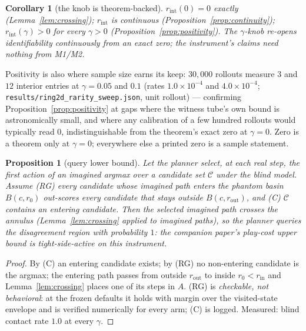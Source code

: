 \documentclass[11pt]{article}
\newtheorem{proposition}{Proposition}
\newtheorem{corollary}{Corollary}
\theoremstyle{remark}
\begin{document}
\begin{corollary}[the knob is theorem-backed]
\label{cor:knob}
$r_{\mathrm{int}}(0) = 0$ exactly (Lemma~\ref{lem:crossing});
$r_{\mathrm{int}}$ is continuous (Proposition~\ref{prop:continuity});
$r_{\mathrm{int}}(\gamma) > 0$ for every $\gamma > 0$
(Proposition~\ref{prop:positivity}). The $\gamma$-knob re-opens
identifiability \emph{continuously from an exact zero}; the instrument's
claims need nothing from M1/M2.
\end{corollary}

Positivity is also where sample size earns its keep: $30{,}000$ rollouts
measure $3$ and $12$ interior entries at $\gamma = 0.05$ and $0.1$
(rates $1.0\times10^{-4}$ and $4.0\times10^{-4}$;
\texttt{results/ring2d\_rarity\_sweep.json}, unit rollout) ---
confirming Proposition~\ref{prop:positivity} at gaps where the witness
tube's own bound is astronomically small, and where any calibration of a
few hundred rollouts would typically read $0$, indistinguishable from
the theorem's exact zero at $\gamma = 0$. Zero is a theorem only at
$\gamma = 0$; everywhere else a printed zero is a sample statement.

\begin{proposition}[query lower bound]
\label{prop:query}
Let the planner select, at each real step, the first action of an imagined
argmax over a candidate set $\mathcal{C}$ under the blind model. Assume
\textup{(RG)} every candidate whose imagined path enters the phantom
basin $B(c, r_0)$ out-scores every candidate that stays outside
$B(c, r_{\mathrm{out}})$, and \textup{(C)} $\mathcal{C}$ contains an
entering candidate. Then the selected imagined path crosses the annulus
(Lemma~\ref{lem:crossing} applied to imagined paths), so the planner
queries the disagreement region with probability $1$: the companion
paper's play-cost upper bound is tight-side-active on this instrument.
\end{proposition}
\begin{proof}
By (C) an entering candidate exists; by (RG) no non-entering candidate is
the argmax; the entering path passes from outside $r_{\mathrm{out}}$ to
inside $r_0 < r_{\mathrm{in}}$ and Lemma~\ref{lem:crossing} places one of
its steps in $A$. (RG) is \emph{checkable, not behavioral}: at the frozen
defaults it holds with margin over the visited-state envelope and is
verified numerically for every arm; (C) is logged. Measured: blind
contact rate $1.0$ at
every $\gamma$.
\end{proof}
\end{document}
